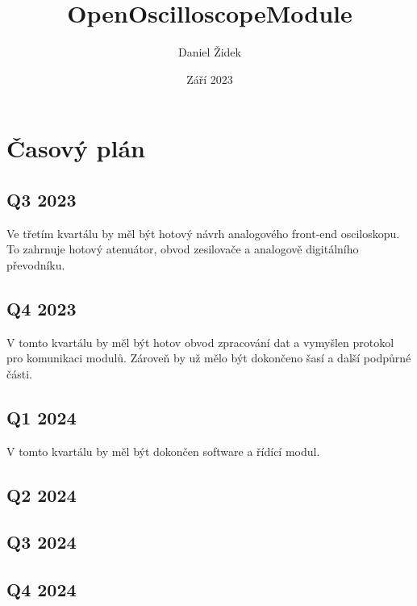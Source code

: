 \documentclass[12pt]{article}
\title{OpenOscilloscopeModule}
\author{Daniel Židek}
\date{Září 2023}
\renewcommand{\listfigurename}{Seznam obrázků}
\renewcommand{\listtablename}{Seznam tabulek}
\begin{document}





\setcounter{page}{2}

\tableofcontents

\newpage

\renewcommand{\listfigurename}{Seznam obrázků}
\listoffigures

\newpage

\renewcommand{\listtablename}{Seznam tabulek}
\listoftables

\newpage

\section{Časový plán}

\subsection{Q3 2023}

Ve třetím kvartálu by měl být hotový návrh analogového front-end osciloskopu.
To zahrnuje hotový atenuátor, obvod zesilovače a analogově digitálního převodníku.

\subsection{Q4 2023}

V tomto kvartálu by měl být hotov obvod zpracování dat a vymyšlen protokol pro
komunikaci modulů. Zároveň by už mělo být dokončeno šasí a další podpůrné části.

\subsection{Q1 2024}

V tomto kvartálu by měl být dokončen software a řídící modul.

\subsection{Q2 2024}

\subsection{Q3 2024}

\subsection{Q4 2024}
\end{document}
